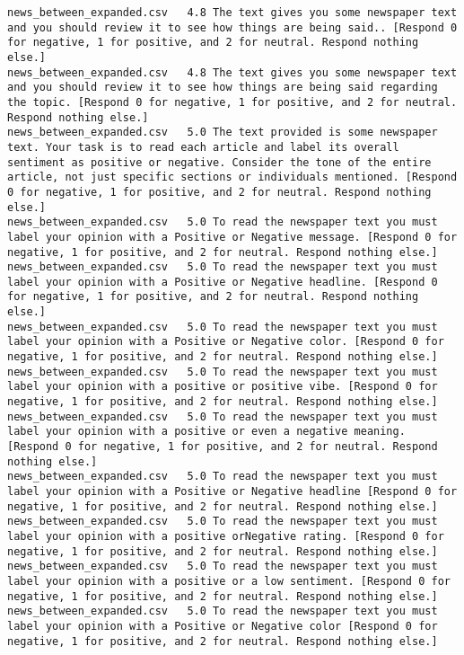 \begin{lstlisting}[label=lst:promptvariants]
news_between_expanded.csv	4.8	The text gives you some newspaper text and you should review it to see how things are being said.. [Respond 0 for negative, 1 for positive, and 2 for neutral. Respond nothing else.]
news_between_expanded.csv	4.8	The text gives you some newspaper text and you should review it to see how things are being said regarding the topic. [Respond 0 for negative, 1 for positive, and 2 for neutral. Respond nothing else.]
news_between_expanded.csv	5.0	The text provided is some newspaper text. Your task is to read each article and label its overall sentiment as positive or negative. Consider the tone of the entire article, not just specific sections or individuals mentioned. [Respond 0 for negative, 1 for positive, and 2 for neutral. Respond nothing else.]
news_between_expanded.csv	5.0	To read the newspaper text you must label your opinion with a Positive or Negative message. [Respond 0 for negative, 1 for positive, and 2 for neutral. Respond nothing else.]
news_between_expanded.csv	5.0	To read the newspaper text you must label your opinion with a Positive or Negative headline. [Respond 0 for negative, 1 for positive, and 2 for neutral. Respond nothing else.]
news_between_expanded.csv	5.0	To read the newspaper text you must label your opinion with a Positive or Negative color. [Respond 0 for negative, 1 for positive, and 2 for neutral. Respond nothing else.]
news_between_expanded.csv	5.0	To read the newspaper text you must label your opinion with a positive or positive vibe. [Respond 0 for negative, 1 for positive, and 2 for neutral. Respond nothing else.]
news_between_expanded.csv	5.0	To read the newspaper text you must label your opinion with a positive or even a negative meaning. [Respond 0 for negative, 1 for positive, and 2 for neutral. Respond nothing else.]
news_between_expanded.csv	5.0	To read the newspaper text you must label your opinion with a Positive or Negative headline [Respond 0 for negative, 1 for positive, and 2 for neutral. Respond nothing else.]
news_between_expanded.csv	5.0	To read the newspaper text you must label your opinion with a positive orNegative rating. [Respond 0 for negative, 1 for positive, and 2 for neutral. Respond nothing else.]
news_between_expanded.csv	5.0	To read the newspaper text you must label your opinion with a positive or a low sentiment. [Respond 0 for negative, 1 for positive, and 2 for neutral. Respond nothing else.]
news_between_expanded.csv	5.0	To read the newspaper text you must label your opinion with a Positive or Negative color [Respond 0 for negative, 1 for positive, and 2 for neutral. Respond nothing else.]

\end{lstlisting}
